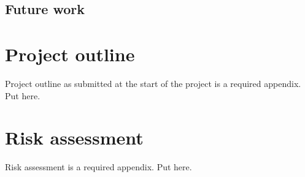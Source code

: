 	\subsection{Future work}
    \lipsum[1-2] \cite{ref:jCAS10,ref:jCAS09,ref:jCAS09a} \lipsum[3-5]



\printbibliography[title={References},heading=bibintoc] %



\begin{uomappendix} 
    \section{Project outline}
    Project outline as submitted at the start of the project is a required appendix. Put here. 
    
    \section{Risk assessment}
    Risk assessment is a required appendix. Put here.
    
\end{uomappendix}


